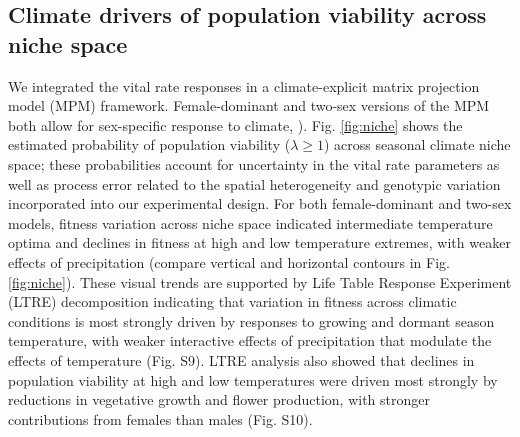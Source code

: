 \documentclass[9pt,twocolumn,twoside,lineno]{pnas-new}
\newcommand{\tom}[2]{{\color{red}{#1}}\footnote{\textit{\color{red}{#2}}}}
\newcommand{\revise}[1]{{\color{Mahogany}{#1}}}
\begin{document}
\subsection*{Climate drivers of population viability across niche space}
We integrated the vital rate responses in a climate-explicit matrix projection model (MPM) framework. 
Female-dominant  and two-sex versions of the MPM  both allow for sex-specific response to climate, \revise{ but only the two-sex model accounts for the feedback between OSR and seed fertilization (pollen limitation under female-biased sex ratios: Fig. S12}).
Fig. \ref{fig:niche} shows the estimated probability of population viability ($\lambda \ge 1$) across seasonal climate niche space; these probabilities account for uncertainty in the vital rate parameters as well as process error related to the spatial heterogeneity and genotypic variation incorporated into our experimental design. 
For both female-dominant and two-sex models, fitness variation across niche space indicated intermediate temperature optima and declines in fitness at high and low temperature extremes, with weaker effects of precipitation (compare vertical and horizontal contours in Fig. \ref{fig:niche}). 
 These visual trends are supported by Life Table Response Experiment (LTRE) decomposition indicating that variation in fitness across climatic conditions is most strongly driven by responses to growing and dormant season temperature, with weaker interactive effects of precipitation that modulate the effects of temperature (Fig. S9). 
LTRE analysis also showed that declines in population viability at high and low temperatures were driven most strongly by reductions in vegetative growth and flower production, with stronger contributions from females than males (Fig. S10).
\end{document}
